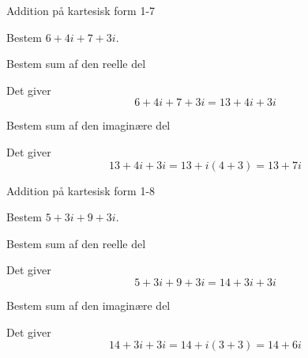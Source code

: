 \documentclass{article}
\begin{document}
\newpage

\begin{exercise}{Addition på kartesisk form 1-7}
	
	Bestem $6+4i+7+3i$.
	
	
	\hint
	
	Bestem sum af den reelle del
	
	\hint
	
	Det giver
	\[
	6+4i+7+3i = 13 + 4i +3i
	\]
	
	\hint
	
	Bestem sum af den imaginære del 
	
	
	\hint
	
	Det giver 
	\[
	13 + 4i +3i = 13 + i(4+3) = 13  + 7i
	\]
	
\end{exercise}

\newpage

\begin{exercise}{Addition på kartesisk form 1-8}
	
	Bestem $5+3i+9+3i$.
	
	
	\hint
	
	Bestem sum af den reelle del
	
	\hint
	
	Det giver
	\[
	5+3i+9+3i = 14 + 3i + 3i
	\]
	
	\hint
	
	Bestem sum af den imaginære del 
	
	
	\hint
	
	Det giver 
	\[
	14 + 3i + 3i = 14 + i(3+3)= 14 + 6i
	\]
	
\end{exercise}
\end{document}
